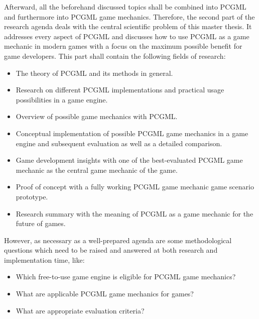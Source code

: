 \documentclass[MGS,Master,english]{twbook}%
\begin{document}
Afterward, all the beforehand discussed topics shall be combined into PCGML and furthermore into PCGML game mechanics. Therefore, the second part of the research agenda deals with the central scientific problem of this master thesis. It addresses every aspect of \ac{PCGML} and discusses how to use \ac{PCGML} as a game mechanic in modern games with a focus on the maximum possible benefit for game developers. This part shall contain the following fields of research: 
\begin{itemize}
	\item The theory of \ac{PCGML} and its methods in general.
	\item Research on different \ac{PCGML} implementations and practical usage possibilities in a game engine.
	\item Overview of possible game mechanics with \ac{PCGML}.
	\item Conceptual implementation of possible \ac{PCGML} game mechanics in a game engine and subsequent evaluation as well as a detailed comparison.
	\item Game development insights with one of the best-evaluated PCGML game mechanic as the central game mechanic of the game.
	\item Proof of concept with a fully working PCGML game mechanic game scenario prototype.
	\item Research summary with the meaning of \ac{PCGML} as a game mechanic for the future of games. 
\end{itemize}

However, as necessary as a well-prepared agenda are some methodological questions which need to be raised and answered at both research and implementation time, like:
\begin{itemize}
	\item Which free-to-use game engine is eligible for PCGML game mechanics?
	\item What are applicable PCGML game mechanics for games?
	\item What are appropriate evaluation criteria? 
\end{itemize} 
\end{document}

